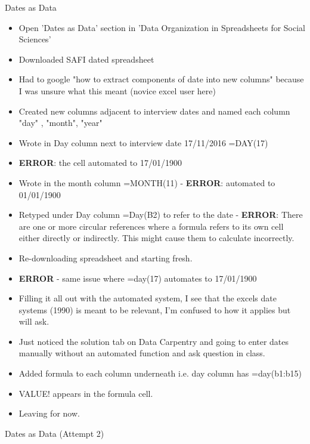 \documentclass{article}
\begin{document}
Dates as Data 
\begin{itemize}
\item Open 'Dates as Data' section in 'Data Organization in Spreadsheets for Social Sciences'
\item Downloaded SAFI dated spreadsheet
\item Had to google "how to extract components of date into new columns" because I was unsure what this meant (novice excel user here)
\item Created new columns adjacent to interview dates and named each column "day" , "month", "year" 
\item Wrote in Day column next to interview date 17/11/2016 =DAY(17) 
\item \textbf{ERROR}: the cell automated to 17/01/1900
\item Wrote in the month column =MONTH(11) - \textbf{ERROR}: automated to 01/01/1900
\item Retyped under Day column =Day(B2) to refer to the date - \textbf{ERROR}: There are one or more circular references where a formula refers to its own cell either directly or indirectly. This might cause them to calculate incorrectly.
\item Re-downloading spreadsheet and starting fresh.
\item \textbf{ERROR} - same issue where =day(17) automates to 17/01/1900
\item Filling it all out with the automated system, I see that the excels date systems (1990) is meant to be relevant, I'm confused to how it applies but will ask.
\item Just noticed the solution tab on Data Carpentry and going to enter dates manually without an automated function and ask question in class.
\item Added formula to each column underneath i.e. day column has =day(b1:b15)
\item VALUE! appears in the formula cell. 
\item Leaving for now.
\end{itemize}

Dates as Data (Attempt 2)
\end{document}
